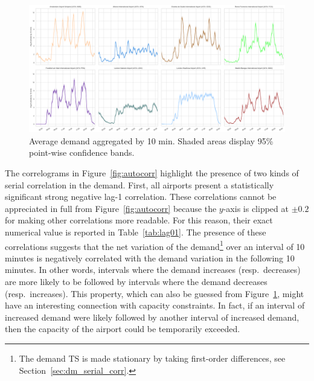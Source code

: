 \documentclass[final,review]{elsarticle}
\begin{document}
\begin{figure}
  \includegraphics[width=\textwidth]{AvgArrivals}
  \caption{Average demand aggregated by 10 min. Shaded areas display 95\% point-wise confidence bands.}\label{fig:AvgArrivals}
\end{figure}

The correlograms in Figure~\ref{fig:autocorr} highlight the presence of two kinds of serial correlation in the demand.
First, all airports present a statistically significant strong negative lag-1 correlation.
These correlations cannot be appreciated in full from Figure~\ref{fig:autocorr} because the \(y\)-axis is clipped at \(\pm 0.2\) for making other correlations more readable. For this reason, their exact numerical value is reported in Table~\ref{tab:lag01}.
The presence of these correlations suggests that the net variation of the demand\footnote{The demand \ac{TS} is made stationary by taking first-order differences, see Section~\ref{sec:dm_serial_corr}.} over an interval of 10 minutes is negatively correlated with the demand variation in the following 10 minutes.
In other words, intervals where the demand increases (resp.\ decreases) are more likely to be followed by intervals where the demand decreases (resp.\ increases).
This property, which can also be guessed from Figure~\ref{fig:AvgArrivals}, might have an interesting connection with capacity constraints.
In fact, if an interval of increased demand were likely followed by another interval of increased demand, then the capacity of the airport could be temporarily exceeded.
\end{document}
